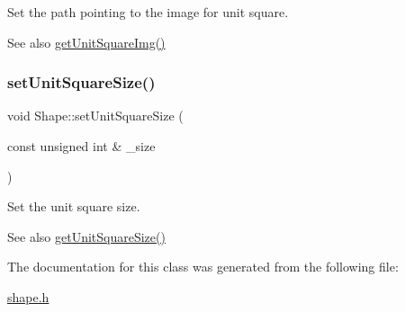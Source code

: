 Set the path pointing to the image for unit square. 

\begin{DoxySeeAlso}{See also}
\mbox{\hyperlink{class_shape_a392209d780a35dbf8e2311ce02121bde}{get\+Unit\+Square\+Img()}} 
\end{DoxySeeAlso}
\mbox{\label{class_shape_a7891a1b03a0034b6a9f4c622902a071c}} 
\subsubsection{\texorpdfstring{set\+Unit\+Square\+Size()}{setUnitSquareSize()}}
{\footnotesize\ttfamily void Shape\+::set\+Unit\+Square\+Size (\begin{DoxyParamCaption}\item[{const unsigned int \&}]{\+\_\+size }\end{DoxyParamCaption})\hspace{0.3cm}{\ttfamily [inline]}}



Set the unit square size. 

\begin{DoxySeeAlso}{See also}
\mbox{\hyperlink{class_shape_a85f4b751a60f6df5afdbfb5b530f6bc3}{get\+Unit\+Square\+Size()}} 
\end{DoxySeeAlso}


The documentation for this class was generated from the following file\+:\begin{DoxyCompactItemize}
\item 
\mbox{\hyperlink{shape_8h}{shape.\+h}}\end{DoxyCompactItemize}
